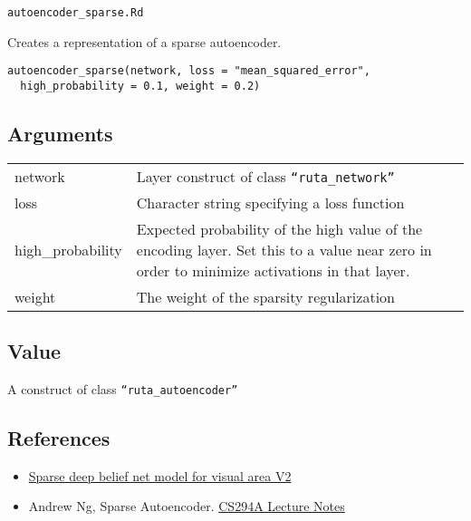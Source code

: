 \texttt{autoencoder\_sparse.Rd}

Creates a representation of a sparse autoencoder.

\begin{verbatim}
autoencoder_sparse(network, loss = "mean_squared_error",
  high_probability = 0.1, weight = 0.2)
\end{verbatim}

\hypertarget{arguments}{\subsection{\texorpdfstring{\protect\hyperlink{arguments}{}Arguments}{Arguments}}\label{arguments}}

\begin{longtable}[c]{@{}>{\small}p{3cm}>{\raggedright}p{12.5cm}@{}}
\toprule
network & Layer construct of class
\texttt{``ruta\_network''}\tabularnewline
loss & Character string specifying a loss function\tabularnewline
high\_probability & Expected probability of the high value of the
encoding layer. Set this to a value near zero in order to minimize
activations in that layer.\tabularnewline
weight & The weight of the sparsity regularization\tabularnewline
\bottomrule
\end{longtable}

\hypertarget{value}{\subsection{\texorpdfstring{\protect\hyperlink{value}{}Value}{Value}}\label{value}}

A construct of class \texttt{``ruta\_autoencoder''}

\hypertarget{references}{\subsection{\texorpdfstring{\protect\hyperlink{references}{}References}{References}}\label{references}}

\begin{itemize}
\item
  \href{http://papers.nips.cc/paper/3313-sparse-deep-belief-net-model-for-visual-area-v2}{Sparse
  deep belief net model for visual area V2}
\item
  Andrew Ng, Sparse Autoencoder.
  \href{https://web.stanford.edu/class/cs294a/sparseAutoencoder_2011new.pdf}{CS294A
  Lecture Notes}
\end{itemize}

